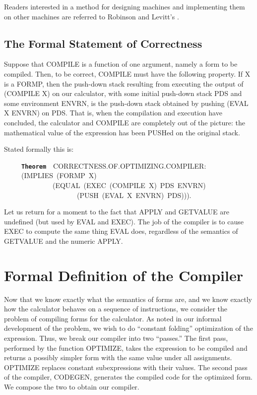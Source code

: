 \documentclass[11pt]{book}
\newenvironment{pubasis}{\begin{flushleft}\ttfamily\small}{\normalsize\rmfamily\end{flushleft}}
\newcommand{\axiomordefinition}[1]{\vspace{6pt}\texttt{\textbf{#1}}}
\newcommand{\pubdefaulttextsize}{\large}
\begin{document}
Readers interested in a method for designing machines and
implementing
them on other machines are referred to Robinson and Levitt's
\cite{LARRY}.
\subsection{The Formal Statement of Correctness}
\pubdefaulttextsize
Suppose that COMPILE is a function of one argument, namely a form
to be compiled.
Then, to be correct, COMPILE must have the following property.
If X is a FORMP, then the push-down stack resulting from executing the
output of (COMPILE X) on our calculator, with some initial push-down
stack PDS and some environment ENVRN, is   the push-down stack
obtained by pushing (EVAL X ENVRN) on PDS.  That is, when the compilation and execution have concluded,
the calculator and COMPILE are completely out of the picture:
the mathematical value of the expression has been PUSHed on the original
stack.

Stated formally this is:
\begin{pubasis}
~~~~~\axiomordefinition{Theorem}~~CORRECT\-NESS.OF.OPTIMIZING.COMPILER:\\
~~~~~(IMPLIES~(FORMP~X)\\
~~~~~~~~~~~~~~(EQUAL~(EXEC~(COMPILE~X)~PDS~ENVRN)\\
~~~~~~~~~~~~~~~~~~~~~(PUSH~(EVAL~X~ENVRN)~PDS))).\\
\end{pubasis}
Let us return for a moment to the fact that APPLY and GETVALUE are
undefined (but used by EVAL and EXEC).  The job of the compiler
is to cause EXEC to compute the same thing EVAL
does, regardless of the semantics of GETVALUE and the numeric APPLY.
\section{Formal Definition of the Compiler}
\pubdefaulttextsize
Now that we know exactly what the semantics of forms are, and we know
exactly how the calculator behaves on a sequence of instructions, we
consider the problem of compiling forms for the calculator.
As noted in our informal development of the problem, we wish to
do ``constant folding'' optimization of the expression.  Thus, we 
break our compiler into two ``passes.''  The first pass, performed
by the function OPTIMIZE, takes the expression to be compiled and returns a
possibly simpler
form with the same value under all assignments.  OPTIMIZE replaces constant
subexpressions with their values.
The second pass of the compiler, CODEGEN,
generates the compiled code for the optimized form.  We
compose the two to obtain our compiler.
\end{document}
